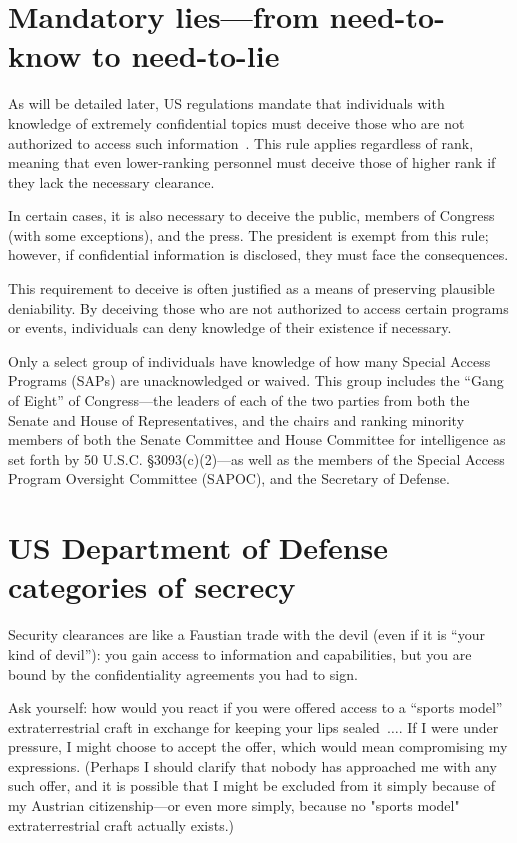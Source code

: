 \section{Mandatory lies---from need-to-know to need-to-lie}
\label{2023-UFO-part-Perception-crash-retreivals-fntktntl}

As will be detailed later, US regulations mandate that individuals with knowledge of extremely confidential topics must deceive
those who are not authorized to access such information~\cite{vanderReijden2005,Sweetman2000,Dolan-MrX-Disclosure2020Jul}.
This rule applies regardless of rank, meaning that even lower-ranking personnel must deceive those of higher rank if they lack the necessary clearance.

In certain cases, it is also necessary to deceive the public, members of Congress (with some exceptions), and the press.
The president is exempt from this rule; however, if confidential information is disclosed, they must face the consequences.

This requirement to deceive is often justified as a means of preserving plausible deniability.
By deceiving those who are not authorized to access certain programs or events, individuals can deny knowledge of their existence if necessary.

Only a select group of individuals have knowledge of how many Special Access Programs (SAPs) are unacknowledged or waived.
This group includes the ``Gang of Eight'' of Congress---the leaders of each of the two parties from both the Senate and House of Representatives,
and the chairs and ranking minority members of
both the Senate Committee and House Committee for intelligence as set forth by 50 U.S.C. \S 3093(c)(2)---as well as the members of the Special Access Program Oversight Committee (SAPOC), and the Secretary of Defense.

\section{US Department of Defense categories of secrecy}

\label{2023-UFO-part-Perception-crash-retreivals-USDOFCOS}

Security clearances are like a Faustian trade with the devil (even if it is ``your kind of devil''): you gain access to information and capabilities, but you are bound by the confidentiality agreements you had to sign.

Ask yourself: how would you react if you were offered access to a ``sports model'' extraterrestrial craft
in exchange for keeping your lips sealed~$\ldots$. If I were under pressure,
I might choose to accept the offer, which would mean compromising my expressions.
(Perhaps I should clarify that nobody has approached me with any such offer, and it is possible that I might be excluded from it simply because of my Austrian citizenship---or even more simply, because no "sports model" extraterrestrial craft actually exists.)

